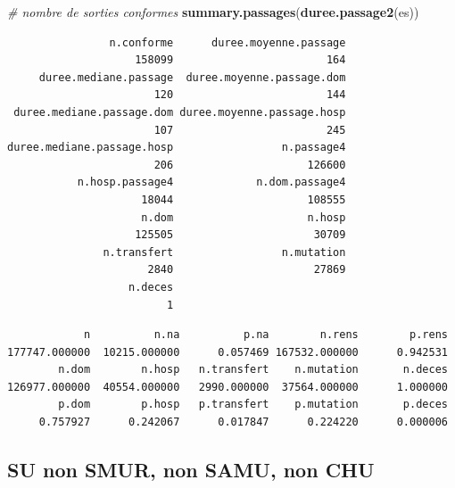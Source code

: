 \documentclass[]{article}
\newenvironment{Shaded}{\begin{snugshade}}{\end{snugshade}}
\newcommand{\KeywordTok}[1]{\textcolor[rgb]{0.13,0.29,0.53}{\textbf{{#1}}}}
\newcommand{\CommentTok}[1]{\textcolor[rgb]{0.56,0.35,0.01}{\textit{{#1}}}}
\newcommand{\NormalTok}[1]{{#1}}
\begin{document}
\begin{Shaded}
\begin{Highlighting}[]
    \CommentTok{# nombre de sorties conformes}
    \KeywordTok{summary.passages}\NormalTok{(}\KeywordTok{duree.passage2}\NormalTok{(es))}
\end{Highlighting}
\end{Shaded}

\begin{verbatim}
                n.conforme      duree.moyenne.passage 
                    158099                        164 
     duree.mediane.passage  duree.moyenne.passage.dom 
                       120                        144 
 duree.mediane.passage.dom duree.moyenne.passage.hosp 
                       107                        245 
duree.mediane.passage.hosp                 n.passage4 
                       206                     126600 
           n.hosp.passage4             n.dom.passage4 
                     18044                     108555 
                     n.dom                     n.hosp 
                    125505                      30709 
               n.transfert                 n.mutation 
                      2840                      27869 
                   n.deces 
                         1 
\end{verbatim}

\begin{Shaded}
\end{Shaded}

\begin{verbatim}
            n          n.na          p.na        n.rens        p.rens 
177747.000000  10215.000000      0.057469 167532.000000      0.942531 
        n.dom        n.hosp   n.transfert    n.mutation       n.deces 
126977.000000  40554.000000   2990.000000  37564.000000      1.000000 
        p.dom        p.hosp   p.transfert    p.mutation       p.deces 
     0.757927      0.242067      0.017847      0.224220      0.000006 
\end{verbatim}

\subsection{SU non SMUR, non SAMU, non
CHU}\label{su-non-smur-non-samu-non-chu}
\end{document}
